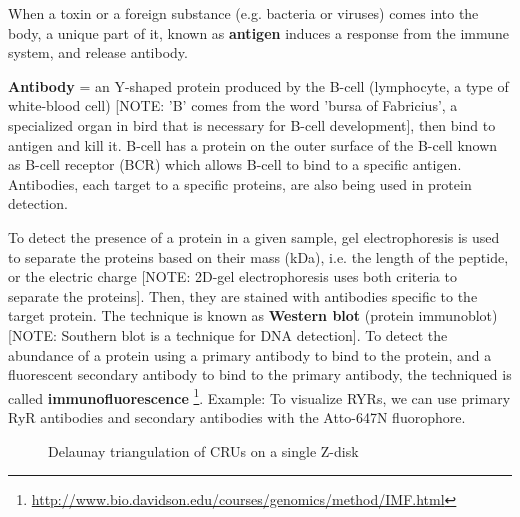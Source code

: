 \begin{framed} 

When a toxin or a foreign substance (e.g. bacteria or viruses) comes into
the body, a unique part of it, known as {\bf antigen}  induces a response
from the immune system, and release antibody.

{\bf Antibody} = an Y-shaped protein produced by the B-cell (lymphocyte, a type
of white-blood cell) [NOTE: 'B' comes from the word 'bursa of Fabricius', a
specialized organ in bird that is necessary for B-cell development], then bind
to antigen and kill it. B-cell has a protein on the outer surface of the B-cell
known as B-cell receptor (BCR) which allows B-cell to bind to a specific antigen.
Antibodies, each target to a specific proteins, are also being used in protein
detection.

To detect the presence of a protein in a given sample, gel electrophoresis is
used to separate the proteins based on their mass (kDa), i.e. the length of the
peptide, or the electric charge [NOTE: 2D-gel electrophoresis uses both criteria
to separate the proteins]. Then, they are stained with antibodies specific to
the target protein. The technique is known as {\bf Western blot} (protein
immunoblot) [NOTE: Southern blot is a technique for
DNA detection]. To detect the abundance of a protein using a primary antibody to
bind to the protein, and a fluorescent secondary antibody to bind to the
primary antibody, the techniqued is called {\bf immunofluorescence}
\footnote{\url{http://www.bio.davidson.edu/courses/genomics/method/IMF.html}}.
Example: To visualize RYRs, we can use primary RyR antibodies and  secondary
antibodies with the Atto-647N fluorophore.

\end{framed}

\begin{figure}[hbt]
\label{mov:soeller2007}
\caption{Delaunay triangulation of CRUs on a single Z-disk \citep{soeller2007}}
\end{figure}

